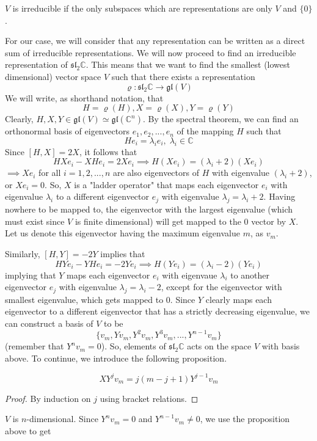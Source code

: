 \documentclass{article}
\begin{document}
    \begin{definition}
    $V$ is irreducible if the only subspaces which are representations are only $V$ and $\{0\}$. 
    \end{definition}
    For our case, we will consider that any representation can be written as a direct sum of irreducible representations. We will now proceed to find an irreducible representation of $\mathfrak{sl}_2 \mathbb{C}$. This means that we want to find the smallest (lowest dimensional) vector space $V$ such that there exists a representation
    \[\varrho: \mathfrak{sl}_2 \mathbb{C} \longrightarrow \mathfrak{gl}(V)\]
    We will write, as shorthand notation, that 
    \[H = \varrho(H), X = \varrho(X), Y = \varrho(Y)\]
    Clearly, $H, X, Y \in \mathfrak{gl}(V) \simeq \mathfrak{gl}(\mathbb{C}^n)$. By the spectral theorem, we can find an orthonormal basis of eigenvectors $e_1, e_2, ..., e_n$ of the mapping $H$ such that
    \[H e_i = \lambda_i e_i, \; \lambda_i \in \mathbb{C}\]
    Since $[H,X] = 2X$, it follows that
    \[HX e_i - X H e_i = 2X e_i \implies H (X e_i) = (\lambda_i + 2) (X e_i)\]
    $\implies Xe_i$ for all $i = 1, 2, ..., n$ are also eigenvectors of $H$ with eigenvalue $(\lambda_i + 2)$, or $X e_i = 0$. So, $X$ is a "ladder operator" that maps each eigenvector $e_i$ with eigenvalue $\lambda_i$ to a different eigenvector $e_j$ with eigenvalue $\lambda_j = \lambda_i + 2$. Having nowhere to be mapped to, the eigenvector with the largest eigenvalue (which must exist since $V$ is finite dimensional) will get mapped to the $0$ vector by $X$. Let us denote this eigenvector having the maximum eigenvalue $m$, as $v_m$. 

    Similarly, $[H,Y] = -2Y$ implies that
    \[HY e_i - YH e_i = -2Y e_i \implies H(Y e_i) = (\lambda_i - 2)(Y e_i)\]
    implying that $Y$ maps each eigenvector $e_i$ with eigenvaue $\lambda_i$ to another eigenvector $e_j$ with eigenvalue $\lambda_j = \lambda_i - 2$, except for the eigenvector with smallest eigenvalue, which gets mapped to $0$. Since $Y$ clearly maps each eigenvector to a different eigenvector that has a strictly decreasing eigenvalue, we can construct a basis of $V$ to be
    \[\{v_m, Y v_m, Y^2 v_m, Y^3 v_m, ..., Y^{n-1} v_m\}\]
    (remember that $Y^n v_m = 0$). So, elements of $\mathfrak{sl}_2 \mathbb{C}$ acts on the space $V$ with basis above. To continue, we introduce the following proposition. 
    \begin{proposition}
    \[X Y^j v_m = j(m-j+1) Y^{j-1} v_m\]
    \end{proposition}
    \begin{proof}
    By induction on $j$ using bracket relations.
    \end{proof}
    $V$ is $n$-dimensional. Since $Y^n v_m = 0$ and $Y^{n-1} v_m \neq 0$, we use the proposition above to get
\end{document}
